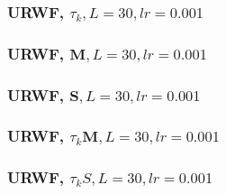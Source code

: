 \documentclass{beamer}
\theoremstyle{definition}
\theoremstyle{remark}
\begin{document}
\begin{frame}
  \begin{figure}
    \frametitle{URWF, $\tau_k,L=30,lr=0.001$}
    \centering
    \resizebox{0.9\textwidth}{!}{}
    \label{fig:rwf_s_01_l_30_lr_0.001}
  \end{figure}
\end{frame}
\begin{frame}
  \begin{figure}
    \frametitle{URWF, $\boldsymbol{M},L=30,lr=0.001$}
    \centering
    \resizebox{0.9\textwidth}{!}{}
    \label{fig:rwf_s_02_l_30_lr_0.001}
  \end{figure}
\end{frame}
\begin{frame}
  \begin{figure}
    \frametitle{URWF, $\boldsymbol{S},L=30,lr=0.001$}
    \centering
    \resizebox{0.9\textwidth}{!}{}
    \label{fig:rwf_s_03_l_30_lr_0.001}
  \end{figure}
\end{frame}
\begin{frame}
  \begin{figure}
    \frametitle{URWF, $\tau_{k}\boldsymbol{M},L=30,lr=0.001$}
    \centering
    \resizebox{0.9\textwidth}{!}{}
    \label{fig:rwf_s_04_l_30_lr_0.001}
  \end{figure}
\end{frame}
\begin{frame}
  \begin{figure}
    \frametitle{URWF, $\tau_k{S},L=30,lr=0.001$}
    \centering
    \resizebox{0.9\textwidth}{!}{}
    \label{fig:rwf_s_05_l_30_lr_0.001}
  \end{figure}
\end{frame}
\end{document}
